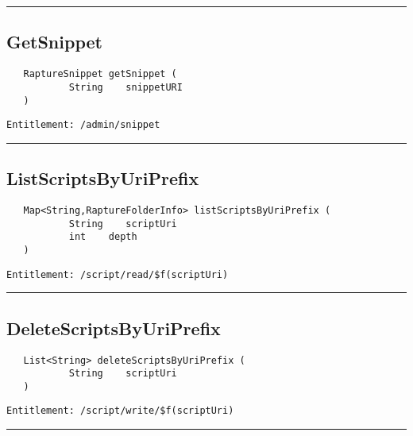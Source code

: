 \rule{12cm}{2pt}
\subsection{GetSnippet}
\label{Api:GetSnippet}
\begin{verbatim}
   RaptureSnippet getSnippet (
           String    snippetURI
   )
\end{verbatim}
\begin{Verbatim}[fontsize=\small, formatcom=\color{Maroon}]
  Entitlement: /admin/snippet
\end{Verbatim}



\rule{12cm}{2pt}
\subsection{ListScriptsByUriPrefix}
\label{Api:ListScriptsByUriPrefix}
\begin{verbatim}
   Map<String,RaptureFolderInfo> listScriptsByUriPrefix (
           String    scriptUri
           int    depth
   )
\end{verbatim}
\begin{Verbatim}[fontsize=\small, formatcom=\color{Maroon}]
  Entitlement: /script/read/$f(scriptUri)
\end{Verbatim}



\rule{12cm}{2pt}
\subsection{DeleteScriptsByUriPrefix}
\label{Api:DeleteScriptsByUriPrefix}
\begin{verbatim}
   List<String> deleteScriptsByUriPrefix (
           String    scriptUri
   )
\end{verbatim}
\begin{Verbatim}[fontsize=\small, formatcom=\color{Maroon}]
  Entitlement: /script/write/$f(scriptUri)
\end{Verbatim}



\rule{12cm}{2pt}
